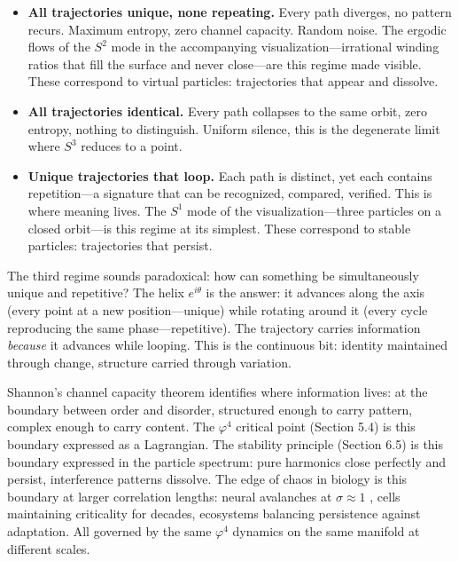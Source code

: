\documentclass[12pt]{article}
\begin{document}
\begin{itemize}
\item \textbf{All trajectories unique, none repeating.} Every path diverges, no pattern recurs. Maximum entropy, zero channel capacity. Random noise. The ergodic flows of the $S^2$ mode in the accompanying visualization---irrational winding ratios that fill the surface and never close---are this regime made visible. These correspond to virtual particles: trajectories that appear and dissolve.

\item \textbf{All trajectories identical.} Every path collapses to the same orbit, zero entropy, nothing to distinguish. Uniform silence, this is the degenerate limit where $S^3$ reduces to a point.

\item \textbf{Unique trajectories that loop.} Each path is distinct, yet each contains repetition---a signature that can be recognized, compared, verified. This is where meaning lives. The $S^1$ mode of the visualization---three particles on a closed orbit---is this regime at its simplest. These correspond to stable particles: trajectories that persist.
\end{itemize}

The third regime sounds paradoxical: how can something be simultaneously unique and repetitive? The helix $e^{i\theta}$ is the answer: it advances along the axis (every point at a new position---unique) while rotating around it (every cycle reproducing the same phase---repetitive). The trajectory carries information \textit{because} it advances while looping. This is the continuous bit: identity maintained through change, structure carried through variation.

Shannon's channel capacity theorem identifies where information lives: at the boundary between order and disorder, structured enough to carry pattern, complex enough to carry content. The $\varphi^4$ critical point (Section 5.4) is this boundary expressed as a Lagrangian. The stability principle (Section 6.5) is this boundary expressed in the particle spectrum: pure harmonics close perfectly and persist, interference patterns dissolve. The edge of chaos in biology is this boundary at larger correlation lengths: neural avalanches at $\sigma \approx 1$ \cite{beggs2003}, cells maintaining criticality for decades, ecosystems balancing persistence against adaptation. All governed by the same $\varphi^4$ dynamics on the same manifold at different scales. 
\end{document}
